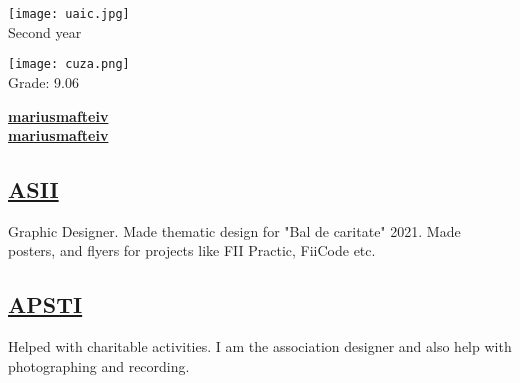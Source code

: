 \documentclass[a4paper]{MagicalCV}
\begin{document}
\lastupdated


\hfill \break





\begin{minipage}[t]{0.38\textwidth} 



\texttt{[image: uaic.jpg]} 
 \\
\vspace{\topsep} %
Second year
\sectionsep

\texttt{[image: cuza.png]} 
\\ 
\vspace{\topsep} %
Grade: 9.06
\sectionsep


 \href{https://github.com/mariusmafteiv}{\bf mariusmafteiv} \\
 \href{https://www.linkedin.com/in/mariusmafteiv/}{\bf mariusmafteiv}
\sectionsep

\subsection{\href{https://www.asii.ro/}{ASII}}
Graphic Designer.
Made thematic design for "Bal de caritate" 2021.
Made posters, and flyers for projects like FII Practic, FiiCode etc.
\sectionsep

\subsection{\href{https://www.facebook.com/AsociatiaPSTI}{APSTI}}
Helped with charitable activities. I am the association designer and also help with photographing and recording.
\sectionsep

\end{minipage} 
\end{document}
